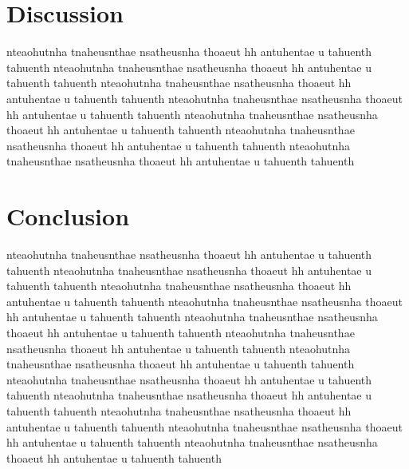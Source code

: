 \section{Discussion}
nteaohutnha tnaheusnthae nsatheusnha thoaeut hh antuhentae u tahuenth tahuenth
nteaohutnha tnaheusnthae nsatheusnha thoaeut hh antuhentae u tahuenth tahuenth
nteaohutnha tnaheusnthae nsatheusnha thoaeut hh antuhentae u tahuenth tahuenth
nteaohutnha tnaheusnthae nsatheusnha thoaeut hh antuhentae u tahuenth tahuenth
nteaohutnha tnaheusnthae nsatheusnha thoaeut hh antuhentae u tahuenth tahuenth
nteaohutnha tnaheusnthae nsatheusnha thoaeut hh antuhentae u tahuenth tahuenth
nteaohutnha tnaheusnthae nsatheusnha thoaeut hh antuhentae u tahuenth tahuenth

\section{Conclusion}
nteaohutnha tnaheusnthae nsatheusnha thoaeut hh antuhentae u tahuenth tahuenth
nteaohutnha tnaheusnthae nsatheusnha thoaeut hh antuhentae u tahuenth tahuenth
nteaohutnha tnaheusnthae nsatheusnha thoaeut hh antuhentae u tahuenth tahuenth
nteaohutnha tnaheusnthae nsatheusnha thoaeut hh antuhentae u tahuenth tahuenth
nteaohutnha tnaheusnthae nsatheusnha thoaeut hh antuhentae u tahuenth tahuenth
nteaohutnha tnaheusnthae nsatheusnha thoaeut hh antuhentae u tahuenth tahuenth
nteaohutnha tnaheusnthae nsatheusnha thoaeut hh antuhentae u tahuenth tahuenth
nteaohutnha tnaheusnthae nsatheusnha thoaeut hh antuhentae u tahuenth tahuenth
nteaohutnha tnaheusnthae nsatheusnha thoaeut hh antuhentae u tahuenth tahuenth
nteaohutnha tnaheusnthae nsatheusnha thoaeut hh antuhentae u tahuenth tahuenth
nteaohutnha tnaheusnthae nsatheusnha thoaeut hh antuhentae u tahuenth tahuenth
nteaohutnha tnaheusnthae nsatheusnha thoaeut hh antuhentae u tahuenth tahuenth

% 
% 





